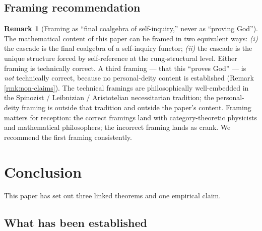 \documentclass[11pt, a4paper]{amsart}
\theoremstyle{definition}
\newtheorem{remark}[theorem]{Remark}
\begin{document}
\subsection{Framing recommendation}

\begin{remark}[Framing as ``final coalgebra of self-inquiry,''
  never as ``proving God'']
\label{rmk:framing}
The mathematical content of this paper can be framed in two
equivalent ways: \emph{(i)} the cascade is the final coalgebra
of a self-inquiry functor; \emph{(ii)} the cascade is the unique
structure forced by self-reference at the rung-structural level.
Either framing is technically correct. A third framing — that
this ``proves God'' — is \emph{not} technically correct, because
no personal-deity content is established (Remark
\ref{rmk:non-claims}). The technical framings are
philosophically well-embedded in the Spinozist / Leibnizian /
Aristotelian necessitarian tradition; the personal-deity framing
is outside that tradition and outside the paper's content.
Framing matters for reception: the correct framings land with
category-theoretic physicists and mathematical philosophers;
the incorrect framing lands as crank. We recommend the first
framing consistently.
\end{remark}

\section{Conclusion}
\label{sec:conclusion}

This paper has set out three linked theorems and one empirical
claim.

\subsection{What has been established}
\end{document}
